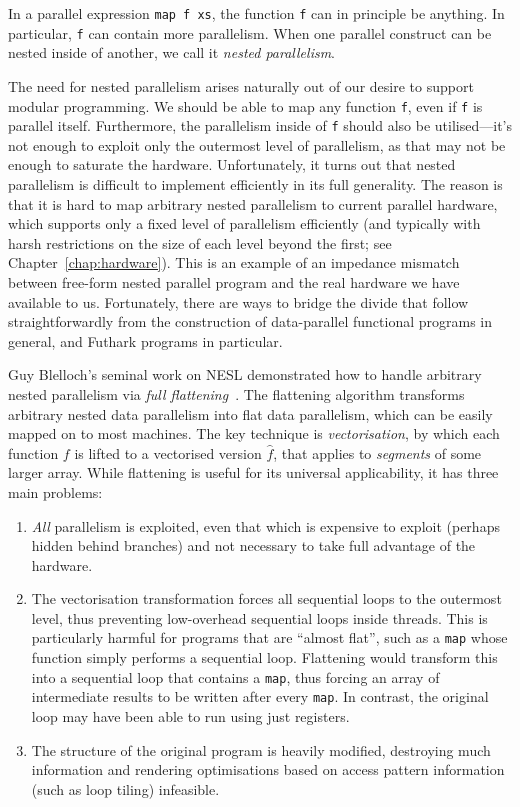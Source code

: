 In a parallel expression \lstinline{map f xs}, the function
\lstinline{f} can in principle be anything.  In particular,
\lstinline{f} can contain more parallelism.  When one parallel
construct can be nested inside of another, we call it \textit{nested
  parallelism}.

The need for nested parallelism arises naturally out of our desire to
support modular programming.  We should be able to map any function
\lstinline{f}, even if \lstinline{f} is parallel itself.  Furthermore,
the parallelism inside of \lstinline{f} should also be utilised---it's
not enough to exploit only the outermost level of parallelism, as that
may not be enough to saturate the hardware.  Unfortunately, it turns
out that nested parallelism is difficult to implement efficiently in
its full generality.  The reason is that it is hard to map arbitrary
nested parallelism to current parallel hardware, which supports only a
fixed level of parallelism efficiently (and typically with harsh
restrictions on the size of each level beyond the first; see
Chapter~\ref{chap:hardware}).  This is an example of an impedance
mismatch between free-form nested parallel program and the real
hardware we have available to us.  Fortunately, there are ways to
bridge the divide that follow straightforwardly from the construction
of data-parallel functional programs in general, and Futhark programs
in particular.

Guy Blelloch's seminal work on NESL demonstrated how to handle
arbitrary nested parallelism via \textit{full
  flattening}~\cite{blelloch1994implementation}.  The flattening
algorithm transforms arbitrary nested data parallelism into flat data
parallelism, which can be easily mapped on to most machines.  The key
technique is \textit{vectorisation}, by which each function $f$ is
lifted to a vectorised version $\hat{f}$, that applies to
\textit{segments} of some larger array.  While flattening is useful
for its universal applicability, it has three main problems:

\begin{enumerate}
\item \textit{All} parallelism is exploited, even that which is
  expensive to exploit (perhaps hidden behind branches) and not
  necessary to take full advantage of the hardware.
\item The vectorisation transformation forces all sequential loops to
  the outermost level, thus preventing low-overhead sequential loops
  inside threads.  This is particularly harmful for programs that are
  ``almost flat'', such as a \lstinline{map} whose function simply
  performs a sequential loop.  Flattening would transform this into a
  sequential loop that contains a \lstinline{map}, thus forcing an
  array of intermediate results to be written after every
  \lstinline{map}.  In contrast, the original loop may have been able
  to run using just registers.
\item The structure of the original program is heavily modified,
  destroying much information and rendering optimisations based on
  access pattern information (such as loop tiling) infeasible.
\end{enumerate}


